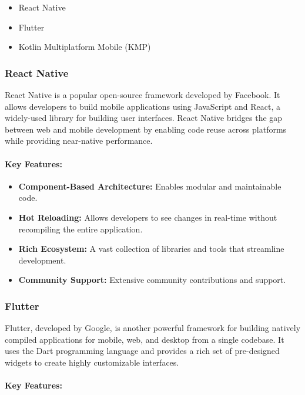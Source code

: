 \begin{itemize}
    \item React Native
    \item Flutter
    \item Kotlin Multiplatform Mobile (KMP)
\end{itemize}

\subsubsection{React Native}

React Native is a popular open-source framework developed by Facebook. It allows developers to build mobile applications using JavaScript and React, a widely-used library for building user interfaces. React Native bridges the gap between web and mobile development by enabling code reuse across platforms while providing near-native performance\cite{ReactNativeBook}.

\paragraph{Key Features:}

\begin{itemize}
    \item \textbf{Component-Based Architecture:} Enables modular and maintainable code.
    \item \textbf{Hot Reloading:} Allows developers to see changes in real-time without recompiling the entire application.
    \item \textbf{Rich Ecosystem:} A vast collection of libraries and tools that streamline development.
    \item \textbf{Community Support:} Extensive community contributions and support.
\end{itemize}

\subsubsection{Flutter}

Flutter, developed by Google, is another powerful framework for building natively compiled applications for mobile, web, and desktop from a single codebase. It uses the Dart programming language and provides a rich set of pre-designed widgets to create highly customizable interfaces\cite{Flutter}.

\paragraph{Key Features:}

